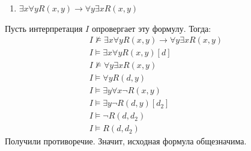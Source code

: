 \documentclass[11pt]{article}
\newcounter{th}\setcounter{th}{0}
\begin{document}
\begin{enumerate}
\item \(\exists x \forall y R(x, y) \to \forall y \exists x R(x, y)\)
\end{enumerate}
Пусть интерпретация \(I\) опровергает эту формулу. Тогда:
\begin{gather*}
I \not\models \exists x\forall y R(x, y) \to \forall y \exists x R(x, y) \\
I \models \exists x \forall y R(x, y)[d] \\
I \not\models \forall y \exists x R(x, y) \\
I \models \forall y R(d, y) \\
I \models \exists y \forall x \lnot R(x, y) \\
I \models \exists y \lnot R(d, y)[d_2] \\
I \models \lnot R(d, d_2) \\
I \models R(d, d_2)
\end{gather*}
Получили противоречие. Значит, исходная формула общезначима.
\end{document}
